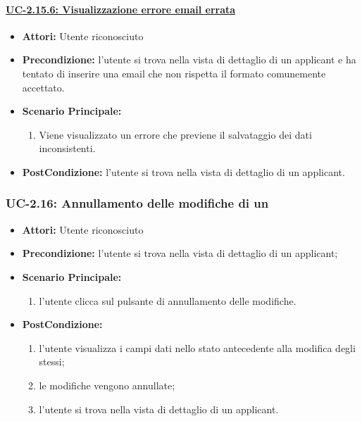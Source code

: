 \paragraph{\underline{UC-2.15.6: Visualizzazione errore email errata}}
\begin{itemize}	
	\item \textbf{Attori:} Utente riconosciuto
	\item \textbf{Precondizione:}  l'utente si trova nella vista di dettaglio di un applicant e ha tentato di inserire una email che non rispetta il formato comunemente accettato.
	\item \textbf{Scenario Principale:}
	\begin{enumerate}
		\item Viene visualizzato un errore che previene il salvataggio dei dati inconsistenti.
	\end{enumerate}
	\item \textbf{PostCondizione:} l'utente si trova nella vista di dettaglio di un applicant.
\end{itemize}


\subsubsection{UC-2.16: Annullamento delle modifiche di un \applicant}
\begin{itemize}
	\item \textbf{Attori:} Utente riconosciuto
	\item \textbf{Precondizione:}  l'utente si trova nella vista di dettaglio di un applicant;
	\item \textbf{Scenario Principale:}
	\begin{enumerate}
		\item l'utente clicca sul pulsante di annullamento delle modifiche.
	\end{enumerate}
	\item \textbf{PostCondizione:} 
	\begin{enumerate}
		\item l'utente visualizza i campi dati nello stato antecedente alla modifica degli stessi;
		\item le modifiche vengono annullate;
		\item l'utente si trova nella vista di dettaglio di un applicant.
	\end{enumerate}
	
\end{itemize}



